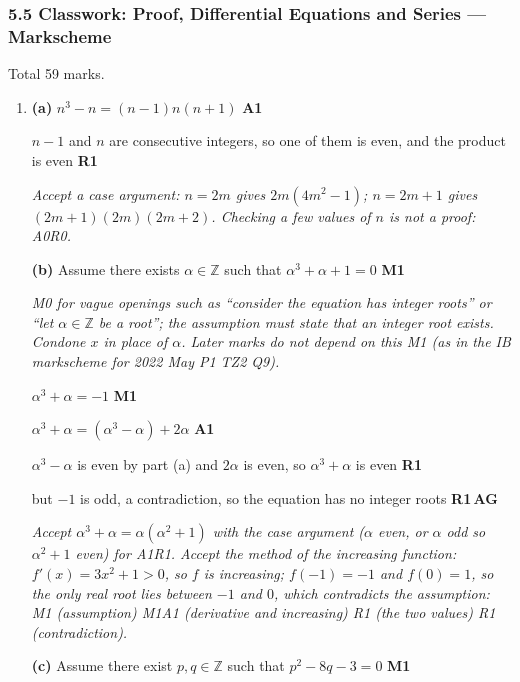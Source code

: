 \documentclass[12pt, twoside]{article}
\begin{document}
\subsubsection*{5.5 Classwork: Proof, Differential Equations and Series --- Markscheme}

Total 59 marks.

\begin{enumerate}[itemsep=0.3cm]

\item[1.] [Maximum mark: 13]

\textbf{(a)} $n^{3} - n = (n - 1)n(n + 1)$ \hfill \textbf{A1}

$n - 1$ and $n$ are consecutive integers, so one of them is even, and
the product is even \hfill \textbf{R1}

\emph{Accept a case argument: $n = 2m$ gives $2m(4m^{2} - 1)$;
$n = 2m + 1$ gives $(2m + 1)(2m)(2m + 2)$. Checking a few values of $n$
is not a proof: A0R0.}

\textbf{(b)} Assume there exists $\alpha \in \mathbb{Z}$ such that
$\alpha^{3} + \alpha + 1 = 0$ \hfill \textbf{M1}

\emph{M0 for vague openings such as ``consider the equation has integer
roots'' or ``let $\alpha \in \mathbb{Z}$ be a root''; the assumption must
state that an integer root exists. Condone $x$ in place of $\alpha$.
Later marks do not depend on this M1 (as in the IB markscheme for 2022
May P1 TZ2 Q9).}

$\alpha^{3} + \alpha = -1$ \hfill \textbf{M1}

$\alpha^{3} + \alpha = \left(\alpha^{3} - \alpha\right) + 2\alpha$
\hfill \textbf{A1}

$\alpha^{3} - \alpha$ is even by part (a) and $2\alpha$ is even, so
$\alpha^{3} + \alpha$ is even \hfill \textbf{R1}

but $-1$ is odd, a contradiction, so the equation has no integer roots
\hfill \textbf{R1}\,\textbf{AG}

\emph{Accept $\alpha^{3} + \alpha = \alpha\left(\alpha^{2} + 1\right)$ with
the case argument ($\alpha$ even, or $\alpha$ odd so $\alpha^{2} + 1$
even) for A1R1. Accept the method of the increasing function:
$f'(x) = 3x^{2} + 1 > 0$, so $f$ is increasing; $f(-1) = -1$ and
$f(0) = 1$, so the only real root lies between $-1$ and $0$, which
contradicts the assumption: M1 (assumption) M1A1 (derivative and
increasing) R1 (the two values) R1 (contradiction).}

\textbf{(c)} Assume there exist $p, q \in \mathbb{Z}$ such that
$p^{2} - 8q - 3 = 0$ \hfill \textbf{M1}


\end{enumerate}
\end{document}
